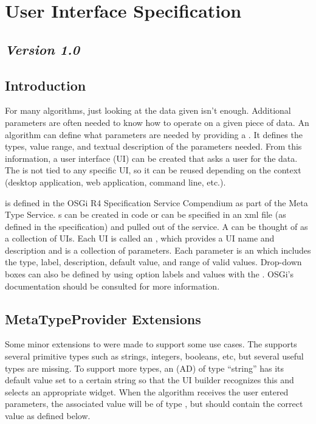 \section{User Interface Specification}
\label{GUISpec}
\subsection*{\textit{Version 1.0}}
\subsection{Introduction}

For many algorithms, just looking at the data given isn't enough. Additional
parameters are often needed to know how to operate on a given piece of data. An
algorithm can define what parameters are needed by providing a
. It defines the types, value range, and textual
description of the parameters needed. From this information, a user interface
(UI) can be created that asks a user for the data. The 
is not tied to any specific UI, so it can be reused depending on the context
(desktop application, web application, command line, etc.).

 is defined in the OSGi R4 Specification Service
Compendium as part of the Meta Type Service. s can be
created in code or can be specified in an xml file (as defined in the
specification) and pulled out of the  service. A
 can be thought of as a collection of UIs. Each UI is
called an , which provides a UI name and
description and is a collection of parameters. Each parameter is an
 which includes the type, label, description, default
value, and range of valid values. Drop-down boxes can also be defined by using
option labels and values with the . OSGi's
documentation should be consulted for more information.

\subsection{MetaTypeProvider Extensions}

Some minor extensions to  were made to support some use
cases. The  supports several primitive types such as
strings, integers, booleans, etc, but several useful types are missing. To
support more types, an  (AD) of type ``string'' has
its default value set to a certain string so that the UI builder recognizes this
and selects an appropriate widget. When the algorithm receives the user entered
parameters, the associated value will be of type , but
should contain the correct value as defined below.

